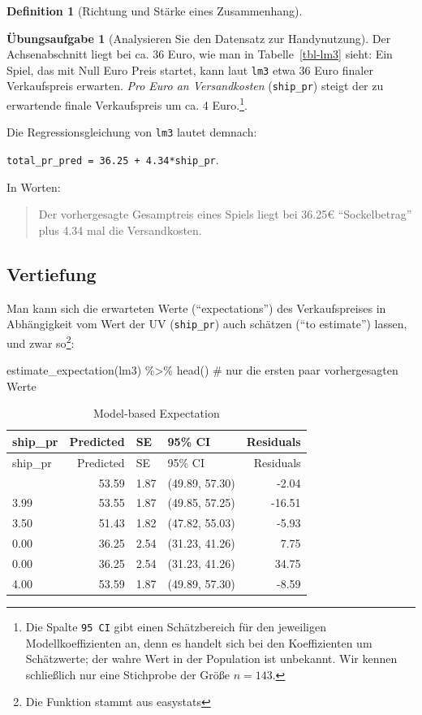 \documentclass[
  a4paper,
  DIV=11]{scrreprt}
\newenvironment{Shaded}{\begin{snugshade}}{\end{snugshade}}
\newcommand{\CommentTok}[1]{\textcolor[rgb]{0.37,0.37,0.37}{#1}}
\newcommand{\FunctionTok}[1]{\textcolor[rgb]{0.28,0.35,0.67}{#1}}
\newcommand{\NormalTok}[1]{\textcolor[rgb]{0.00,0.23,0.31}{#1}}
\newcommand{\SpecialCharTok}[1]{\textcolor[rgb]{0.37,0.37,0.37}{#1}}
\theoremstyle{definition}
\newtheorem{exercise}{Übungsaufgabe}[chapter]
\theoremstyle{definition}
\theoremstyle{definition}
\newtheorem{definition}{Definition}[chapter]
\theoremstyle{remark}
\begin{document}
\begin{definition}[Richtung und Stärke eines
Zusammenhang]
\begin{exercise}[Analysieren Sie den Datensatz zur
Handynutzung]
Der Achsenabschnitt liegt bei ca. 36 Euro, wie man in
Tabelle~\ref{tbl-lm3} sieht: Ein Spiel, das mit Null Euro Preis startet,
kann laut \texttt{lm3} etwa 36 Euro finaler Verkaufspreis erwarten.
\emph{Pro Euro an Versandkosten} (\texttt{ship\_pr}) steigt der zu
erwartende finale Verkaufspreis um ca. 4 Euro.\footnote{Die Spalte
  \texttt{95\ CI} gibt einen Schätzbereich für den jeweiligen
  Modellkoeffizienten an, denn es handelt sich bei den Koeffizienten um
  Schätzwerte; der wahre Wert in der Population ist unbekannt. Wir
  kennen schließlich nur eine Stichprobe der Größe \(n=143\).}.

Die Regressionsgleichung von \texttt{lm3} lautet demnach:

\texttt{total\_pr\_pred\ =\ 36.25\ +\ 4.34*ship\_pr}.

In Worten:

\begin{quote}
Der vorhergesagte Gesamptreis eines Spiels liegt bei 36.25€
``Sockelbetrag'' plus 4.34 mal die Versandkosten.
\end{quote}

\subsection{Vertiefung}\label{vertiefung-7}

Man kann sich die erwarteten Werte (``expectations'') des
Verkaufspreises in Abhängigkeit vom Wert der UV (\texttt{ship\_pr}) auch
schätzen (``to estimate'') lassen, und zwar so\footnote{Die Funktion
  stammt aus easystats}:

\begin{Shaded}
\begin{Highlighting}[]
\FunctionTok{estimate\_expectation}\NormalTok{(lm3) }\SpecialCharTok{\%\textgreater{}\%} \FunctionTok{head}\NormalTok{()  }\CommentTok{\# nur die ersten paar vorhergesagten Werte}
\end{Highlighting}
\end{Shaded}

\begin{longtable}[]{@{}lrllr@{}}
\caption{Model-based Expectation}\tabularnewline
\toprule\noalign{}
ship\_pr & Predicted & SE & 95\% CI & Residuals \\
\midrule\noalign{}
\endfirsthead
\toprule\noalign{}
ship\_pr & Predicted & SE & 95\% CI & Residuals \\
\midrule\noalign{}
\endhead
\bottomrule\noalign{}
\endlastfoot
4.00 & 53.59 & 1.87 & (49.89, 57.30) & -2.04 \\
3.99 & 53.55 & 1.87 & (49.85, 57.25) & -16.51 \\
3.50 & 51.43 & 1.82 & (47.82, 55.03) & -5.93 \\
0.00 & 36.25 & 2.54 & (31.23, 41.26) & 7.75 \\
0.00 & 36.25 & 2.54 & (31.23, 41.26) & 34.75 \\
4.00 & 53.59 & 1.87 & (49.89, 57.30) & -8.59 \\
\end{longtable}


\end{exercise}
\end{definition}
\end{document}

